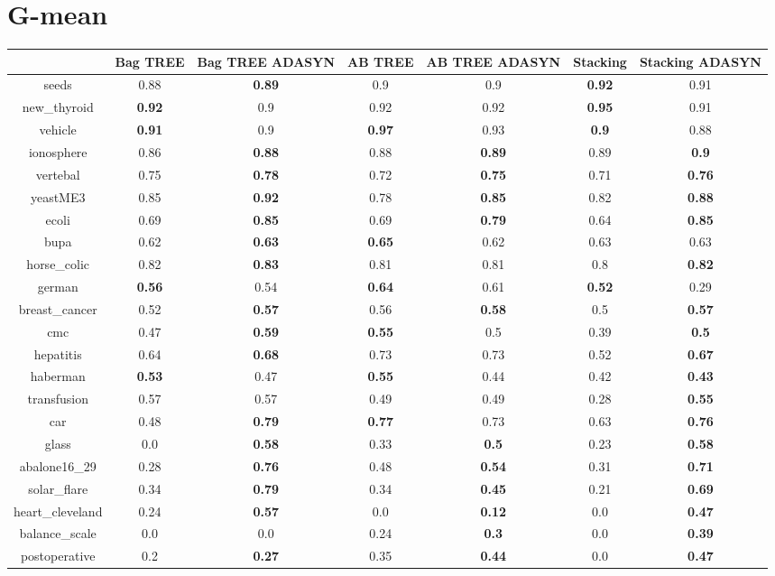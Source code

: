\documentclass{article}%
\begin{document}
%
\section*{G{-}mean}%
\begin{tabular}{c|cccccc}%
&Bag TREE&Bag TREE ADASYN&AB TREE&AB TREE ADASYN&Stacking&Stacking ADASYN\\%
\hline%
seeds&0.88&\textbf{0.89}&0.9&0.9&\textbf{0.92}&0.91\\%
new\_thyroid&\textbf{0.92}&0.9&0.92&0.92&\textbf{0.95}&0.91\\%
vehicle&\textbf{0.91}&0.9&\textbf{0.97}&0.93&\textbf{0.9}&0.88\\%
ionosphere&0.86&\textbf{0.88}&0.88&\textbf{0.89}&0.89&\textbf{0.9}\\%
vertebal&0.75&\textbf{0.78}&0.72&\textbf{0.75}&0.71&\textbf{0.76}\\%
yeastME3&0.85&\textbf{0.92}&0.78&\textbf{0.85}&0.82&\textbf{0.88}\\%
ecoli&0.69&\textbf{0.85}&0.69&\textbf{0.79}&0.64&\textbf{0.85}\\%
bupa&0.62&\textbf{0.63}&\textbf{0.65}&0.62&0.63&0.63\\%
horse\_colic&0.82&\textbf{0.83}&0.81&0.81&0.8&\textbf{0.82}\\%
german&\textbf{0.56}&0.54&\textbf{0.64}&0.61&\textbf{0.52}&0.29\\%
breast\_cancer&0.52&\textbf{0.57}&0.56&\textbf{0.58}&0.5&\textbf{0.57}\\%
cmc&0.47&\textbf{0.59}&\textbf{0.55}&0.5&0.39&\textbf{0.5}\\%
hepatitis&0.64&\textbf{0.68}&0.73&0.73&0.52&\textbf{0.67}\\%
haberman&\textbf{0.53}&0.47&\textbf{0.55}&0.44&0.42&\textbf{0.43}\\%
transfusion&0.57&0.57&0.49&0.49&0.28&\textbf{0.55}\\%
car&0.48&\textbf{0.79}&\textbf{0.77}&0.73&0.63&\textbf{0.76}\\%
glass&0.0&\textbf{0.58}&0.33&\textbf{0.5}&0.23&\textbf{0.58}\\%
abalone16\_29&0.28&\textbf{0.76}&0.48&\textbf{0.54}&0.31&\textbf{0.71}\\%
solar\_flare&0.34&\textbf{0.79}&0.34&\textbf{0.45}&0.21&\textbf{0.69}\\%
heart\_cleveland&0.24&\textbf{0.57}&0.0&\textbf{0.12}&0.0&\textbf{0.47}\\%
balance\_scale&0.0&0.0&0.24&\textbf{0.3}&0.0&\textbf{0.39}\\%
postoperative&0.2&\textbf{0.27}&0.35&\textbf{0.44}&0.0&\textbf{0.47}\\%
\end{tabular}

%
\end{document}
